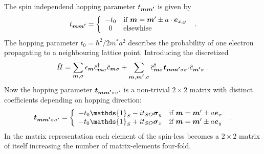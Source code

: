 The spin independend hopping parameter $t_{\boldsymbol{m}\boldsymbol{m'}}$ is given by
\begin{align}
t_{\boldsymbol{m}\boldsymbol{m'}} = \left\{ \begin{array}[c]{cl} -t_0 & \text{if } \boldsymbol{m} = \boldsymbol{m}' \pm a \cdot \boldsymbol{e}_{x,y} \\ 0 & \text{elsewhise} \end{array} \right.\ .
	\label{eqn:t0hopping}
\end{align}
The hopping parameter $t_0 = \hbar^2/2m^*a^2$ describes the probability of one electron propagating to a neighbouring lattice point. Introducing the discretized \rash{} \hamil{}
\begin{align}
	\hat{H} = \sum_{\boldsymbol{m},\sigma} \epsilon_{\boldsymbol{m}} \hat{c}^{\dagger}_{\boldsymbol{m}\sigma} \hat{c}_{\boldsymbol{m}\sigma} +
	\sum_{\boldsymbol{m},\boldsymbol{m'},\sigma}  \hat{c}^{\dagger}_{\boldsymbol{m}\sigma} \boldsymbol{t}_{\boldsymbol{m}\boldsymbol{m'}\sigma\sigma '} \hat{c}_{\boldsymbol{m'}\sigma}\ .
	\label{eqn:discretizedrashbahamil}
\end{align}
Now the hopping parameter $\boldsymbol{t}_{\boldsymbol{m}\boldsymbol{m'}\sigma\sigma '}$ is a non-trivial $2 \times 2$ matrix with distinct coefficients depending on hopping direction:
\begin{align}
	\mat{t}_{\v{m}\v{m'}\sigma\sigma '} = \left\{ \begin{array}[c]{cl} -t_0\mathds{1}_S - i t_{SO} \mat{\sigma}_y & \text{if } \v{m} = \v{m}' \pm a \v{e}_{x} \\
		-t_0\mathds{1}_S + i t_{SO} \mat{\sigma}_x & \text{if } \v{m} = \v{m}' \pm a \v{e}_{y} \end{array} \right.\ .
	\label{eqn:tsohopping}
\end{align}
In the matrix representation each element of the spin-less \hamil{} becomes a $2 \times 2$ matrix of itself increasing the number of matrix-elements four-fold.

